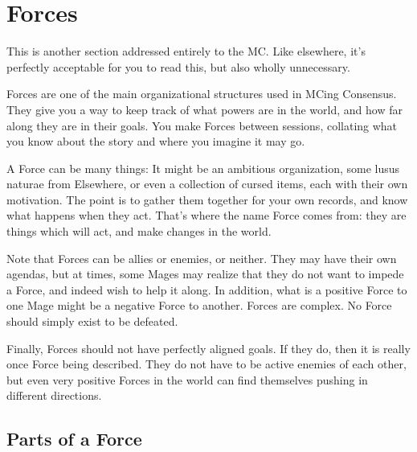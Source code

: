 \documentclass[
  oneside,
  statementpaper,
  9pt]{memoir}
\begin{document}
\newpage

\hypertarget{forces-2}{%
\chapter{Forces}\label{forces-2}}

\begin{Player}

This is another section addressed entirely to the MC. Like elsewhere, it's perfectly acceptable for you to read this, but also wholly unnecessary.

\end{Player}

\begin{MC}

Forces are one of the main organizational structures used in MCing Consensus. They give you a way to keep track of what powers are in the world, and how far along they are in their goals. You make Forces between sessions, collating what you know about the story and where you imagine it may go.

A Force can be many things: It might be an ambitious organization, some lusus naturae from Elsewhere, or even a collection of cursed items, each with their own motivation. The point is to gather them together for your own records, and know what happens when they act. That’s where the name Force comes from: they are things which will act, and make changes in the world.

Note that Forces can be allies or enemies, or neither. They may have their own agendas, but at times, some Mages may realize that they do not want to impede a Force, and indeed wish to help it along. In addition, what is a positive Force to one Mage might be a negative Force to another. Forces are complex. No Force should simply exist to be defeated.

Finally, Forces should not have perfectly aligned goals. If they do, then it is really once Force being described. They do not have to be active enemies of each other, but even very positive Forces in the world can find themselves pushing in different directions.

\end{MC}

\hypertarget{parts-of-a-force}{%
\section{Parts of a Force}\label{parts-of-a-force}}
\end{document}
